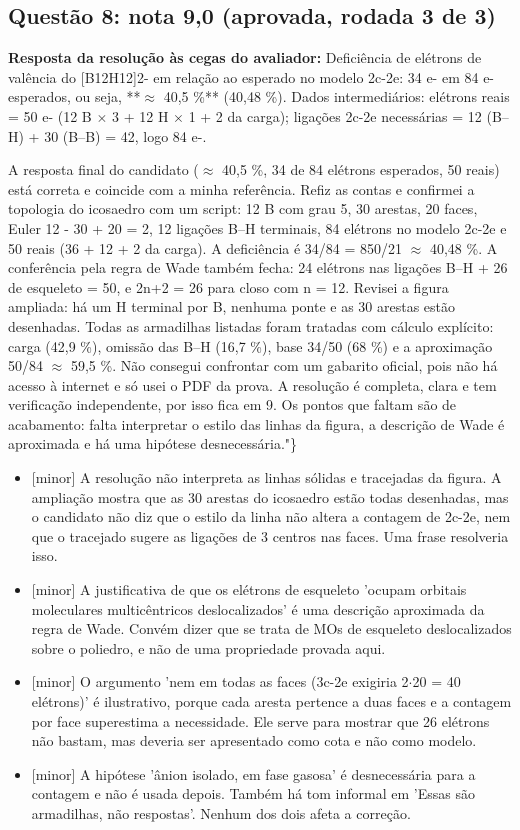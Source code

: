 \documentclass{article}%
\begin{document}
\subsection*{Questão 8: nota 9,0 (aprovada, rodada 3 de 3)}%
\textbf{Resposta da resolução às cegas do avaliador:} Deficiência de elétrons de valência do {[}B12H12{]}2- em relação ao esperado no modelo 2c{-}2e: 34 e- em 84 e- esperados, ou seja, **$\approx$ 40,5 \%** (40,48 \%).\newline%
\newline%
Dados intermediários: elétrons reais = 50 e- (12 B $\times$ 3 + 12 H $\times$ 1 + 2 da carga); ligações 2c{-}2e necessárias = 12 (B--H) + 30 (B--B) = 42, logo 84 e-.\par %
A resposta final do candidato ($\approx$ 40,5 \%, 34 de 84 elétrons esperados, 50 reais) está correta e coincide com a minha referência. Refiz as contas e confirmei a topologia do icosaedro com um script: 12 B com grau 5, 30 arestas, 20 faces, Euler 12 - 30 + 20 = 2, 12 ligações B--H terminais, 84 elétrons no modelo 2c{-}2e e 50 reais (36 + 12 + 2 da carga). A deficiência é 34/84 = 850/21 $\approx$ 40,48 \%. A conferência pela regra de Wade também fecha: 24 elétrons nas ligações B--H + 26 de esqueleto = 50, e 2n+2 = 26 para closo com n = 12. Revisei a figura ampliada: há um H terminal por B, nenhuma ponte e as 30 arestas estão desenhadas. Todas as armadilhas listadas foram tratadas com cálculo explícito: carga (42,9 \%), omissão das B--H (16,7 \%), base 34/50 (68 \%) e a aproximação 50/84 $\approx$ 59,5 \%. Não consegui confrontar com um gabarito oficial, pois não há acesso à internet e só usei o PDF da prova. A resolução é completa, clara e tem verificação independente, por isso fica em 9. Os pontos que faltam são de acabamento: falta interpretar o estilo das linhas da figura, a descrição de Wade é aproximada e há uma hipótese desnecessária."\}%
\begin{itemize}%
\item%
{[}minor{]} A resolução não interpreta as linhas sólidas e tracejadas da figura. A ampliação mostra que as 30 arestas do icosaedro estão todas desenhadas, mas o candidato não diz que o estilo da linha não altera a contagem de 2c{-}2e, nem que o tracejado sugere as ligações de 3 centros nas faces. Uma frase resolveria isso.%
\item%
{[}minor{]} A justificativa de que os elétrons de esqueleto 'ocupam orbitais moleculares multicêntricos deslocalizados' é uma descrição aproximada da regra de Wade. Convém dizer que se trata de MOs de esqueleto deslocalizados sobre o poliedro, e não de uma propriedade provada aqui.%
\item%
{[}minor{]} O argumento 'nem em todas as faces (3c{-}2e exigiria 2$\cdot$20 = 40 elétrons)' é ilustrativo, porque cada aresta pertence a duas faces e a contagem por face superestima a necessidade. Ele serve para mostrar que 26 elétrons não bastam, mas deveria ser apresentado como cota e não como modelo.%
\item%
{[}minor{]} A hipótese 'ânion isolado, em fase gasosa' é desnecessária para a contagem e não é usada depois. Também há tom informal em 'Essas são armadilhas, não respostas'. Nenhum dos dois afeta a correção.%
\end{itemize}%
\end{document}
